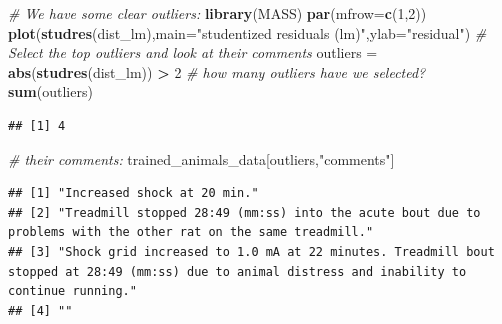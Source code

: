 \documentclass[]{article}
\newenvironment{Shaded}{\begin{snugshade}}{\end{snugshade}}
\newcommand{\KeywordTok}[1]{\textcolor[rgb]{0.13,0.29,0.53}{\textbf{#1}}}
\newcommand{\DataTypeTok}[1]{\textcolor[rgb]{0.13,0.29,0.53}{#1}}
\newcommand{\DecValTok}[1]{\textcolor[rgb]{0.00,0.00,0.81}{#1}}
\newcommand{\StringTok}[1]{\textcolor[rgb]{0.31,0.60,0.02}{#1}}
\newcommand{\CommentTok}[1]{\textcolor[rgb]{0.56,0.35,0.01}{\textit{#1}}}
\newcommand{\OperatorTok}[1]{\textcolor[rgb]{0.81,0.36,0.00}{\textbf{#1}}}
\newcommand{\NormalTok}[1]{#1}
\begin{document}
\begin{Shaded}
\begin{Highlighting}[]
\CommentTok{# We have some clear outliers:}
\KeywordTok{library}\NormalTok{(MASS)}
\KeywordTok{par}\NormalTok{(}\DataTypeTok{mfrow=}\KeywordTok{c}\NormalTok{(}\DecValTok{1}\NormalTok{,}\DecValTok{2}\NormalTok{))}
\KeywordTok{plot}\NormalTok{(}\KeywordTok{studres}\NormalTok{(dist_lm),}\DataTypeTok{main=}\StringTok{"studentized residuals (lm)"}\NormalTok{,}\DataTypeTok{ylab=}\StringTok{"residual"}\NormalTok{)}
\CommentTok{# Select the top outliers and look at their comments}
\NormalTok{outliers =}\StringTok{ }\KeywordTok{abs}\NormalTok{(}\KeywordTok{studres}\NormalTok{(dist_lm)) }\OperatorTok{>}\StringTok{ }\DecValTok{2}
\CommentTok{# how many outliers have we selected?}
\KeywordTok{sum}\NormalTok{(outliers)}
\end{Highlighting}
\end{Shaded}

\begin{verbatim}
## [1] 4
\end{verbatim}

\begin{Shaded}
\begin{Highlighting}[]
\CommentTok{# their comments:}
\NormalTok{trained_animals_data[outliers,}\StringTok{"comments"}\NormalTok{]}
\end{Highlighting}
\end{Shaded}

\begin{verbatim}
## [1] "Increased shock at 20 min."                                                                                                                     
## [2] "Treadmill stopped 28:49 (mm:ss) into the acute bout due to problems with the other rat on the same treadmill."                                  
## [3] "Shock grid increased to 1.0 mA at 22 minutes. Treadmill bout stopped at 28:49 (mm:ss) due to animal distress and inability to continue running."
## [4] ""
\end{verbatim}

\begin{Shaded}
\end{Shaded}
\end{document}
